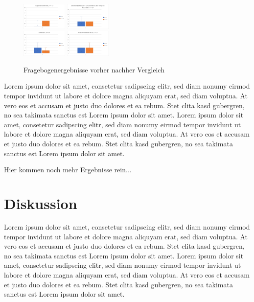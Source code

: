 \documentclass[conference]{IEEEtran}
\begin{document}
\begin{figure}[ht]
	\centering
	\includegraphics[width=0.2\textwidth]{assets/augenBesch.png} \hspace{-5pt}
	\includegraphics[width=0.2\textwidth]{assets/fokus.png} \\
	\vspace{2pt}
	\includegraphics[width=0.2\textwidth]{assets/schwitz.png} \hspace{-5pt}
	\includegraphics[width=0.2\textwidth]{assets/verschwSicht.png}
	\caption{Fragebogenergebnisse vorher nachher Vergleich}
	\label{fig:Fragebogenergebnisse}
\end{figure}
Lorem ipsum dolor sit amet, consetetur sadipscing elitr, sed diam nonumy eirmod tempor invidunt ut labore et dolore magna aliquyam erat, sed diam voluptua. At vero eos et accusam et justo duo dolores et ea rebum. Stet clita kasd gubergren, no sea takimata sanctus est Lorem ipsum dolor sit amet. Lorem ipsum dolor sit amet, consetetur sadipscing elitr, sed diam nonumy eirmod tempor invidunt ut labore et dolore magna aliquyam erat, sed diam voluptua. At vero eos et accusam et justo duo dolores et ea rebum. Stet clita kasd gubergren, no sea takimata sanctus est Lorem ipsum dolor sit amet.

Hier kommen noch mehr Ergebnisse rein...

\section{Diskussion}
Lorem ipsum dolor sit amet, consetetur sadipscing elitr, sed diam nonumy eirmod tempor invidunt ut labore et dolore magna aliquyam erat, sed diam voluptua. At vero eos et accusam et justo duo dolores et ea rebum. Stet clita kasd gubergren, no sea takimata sanctus est Lorem ipsum dolor sit amet. Lorem ipsum dolor sit amet, consetetur sadipscing elitr, sed diam nonumy eirmod tempor invidunt ut labore et dolore magna aliquyam erat, sed diam voluptua. At vero eos et accusam et justo duo dolores et ea rebum. Stet clita kasd gubergren, no sea takimata sanctus est Lorem ipsum dolor sit amet.
\end{document}
